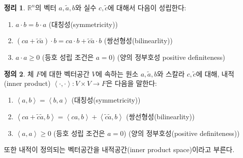 \documentclass[unfonts,oneside,a4paper]{oblivoir}
\theoremstyle{definition}
\newtheorem{definition}{정의}[section]
\theoremstyle{theorem}
\newtheorem{theorem}[definition]{정리}
\theoremstyle{theorem}
\theoremstyle{remark}
\theoremstyle{remark}
\theoremstyle{remark}
\theoremstyle{remark}
\renewcommand{\vec}[1]{\bm{\mathit{#1}}}
\newcommand{\vecz}{\bm{\mathrm{0}}}
\begin{document}
\begin{theorem}
    $\mathbb R^n$의 벡터 $\vec a, \tilde{\vec a}, \vec b$와 실수 $c, \tilde c$에 대해서 다음이 성립한다:
    \begin{enumerate}
        \item $\vec a \cdot \vec b = \vec b \cdot \vec a$ (대칭성(symmetricity))
        \item $(c \vec a + \tilde c \tilde{\vec a}) \cdot \vec b = c \vec a \cdot \vec b + \tilde c \tilde{\vec a} \cdot \vec b$ (쌍선형성(bilinearlity))
        \item $\vec a \cdot \vec a \geq 0$ (등호 성립 조건은 $\vec a = \vecz$) (양의 정부호성 positive definiteness)
    \end{enumerate}
\end{theorem}

\begin{definition}
    체 $F$에 대한 벡터공간 $V$에 속하는 원소 $\vec a, \tilde{\vec a}, \vec b$와 스칼라 $c, \tilde c$에 대해, 내적(inner product) $\left<\cdot, \cdot\right>: V \times V \rightarrow F$은 다음을 말한다:
    \begin{enumerate}
        \item $\left<\vec a, \vec b\right> = \left<\vec b, \vec a\right>$ (대칭성(symmetricity))
        \item $\left<c \vec a + \tilde c \tilde{\vec a}, \vec b\right> = \left<c \vec a, \vec b\right> + \left<\tilde c \tilde{\vec a}, \vec b\right>$ (쌍선형성(bilinearlity))
        \item $\left<\vec a, \vec a\right> \geq 0$ (등호 성립 조건은 $\vec a = \vecz$) (양의 정부호성(positive definiteness))
    \end{enumerate}
    또한 내적이 정의되는 벡터공간을 내적공간(inner product space)이라고 부른다.
\end{definition}
\end{document}
